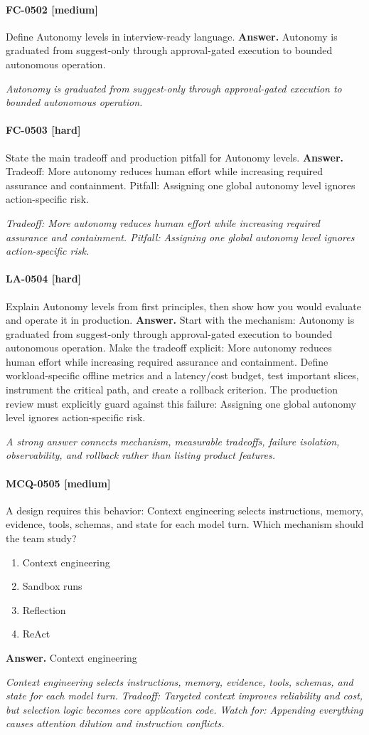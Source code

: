 \paragraph{FC-0502 [medium]} Define Autonomy levels in interview-ready language.
\noindent\textbf{Answer.} Autonomy is graduated from suggest-only through approval-gated execution to bounded autonomous operation.
\par\textit{Autonomy is graduated from suggest-only through approval-gated execution to bounded autonomous operation.}
\paragraph{FC-0503 [hard]} State the main tradeoff and production pitfall for Autonomy levels.
\noindent\textbf{Answer.} Tradeoff: More autonomy reduces human effort while increasing required assurance and containment. Pitfall: Assigning one global autonomy level ignores action-specific risk.
\par\textit{Tradeoff: More autonomy reduces human effort while increasing required assurance and containment. Pitfall: Assigning one global autonomy level ignores action-specific risk.}
\paragraph{LA-0504 [hard]} Explain Autonomy levels from first principles, then show how you would evaluate and operate it in production.
\noindent\textbf{Answer.} Start with the mechanism: Autonomy is graduated from suggest-only through approval-gated execution to bounded autonomous operation. Make the tradeoff explicit: More autonomy reduces human effort while increasing required assurance and containment. Define workload-specific offline metrics and a latency/cost budget, test important slices, instrument the critical path, and create a rollback criterion. The production review must explicitly guard against this failure: Assigning one global autonomy level ignores action-specific risk.
\par\textit{A strong answer connects mechanism, measurable tradeoffs, failure isolation, observability, and rollback rather than listing product features.}
\paragraph{MCQ-0505 [medium]} A design requires this behavior: Context engineering selects instructions, memory, evidence, tools, schemas, and state for each model turn. Which mechanism should the team study?
\begin{enumerate}[label=\Alph*.]
\item Context engineering
\item Sandbox runs
\item Reflection
\item ReAct
\end{enumerate}
\noindent\textbf{Answer.} Context engineering
\par\textit{Context engineering selects instructions, memory, evidence, tools, schemas, and state for each model turn. Tradeoff: Targeted context improves reliability and cost, but selection logic becomes core application code. Watch for: Appending everything causes attention dilution and instruction conflicts.}
